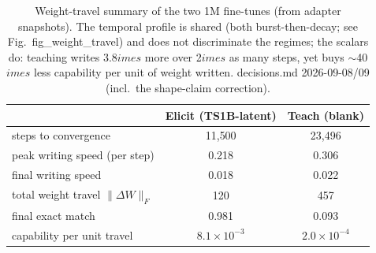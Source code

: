 \begin{table}[t]
\centering
\begin{tabular}{lcc}
\hline
 & Elicit (TS1B-latent) & Teach (blank) \\
\hline
steps to convergence & 11{,}500 & 23{,}496 \\
peak writing speed (per step) & 0.218 & 0.306 \\
final writing speed & 0.018 & 0.022 \\
total weight travel $\|\Delta W\|_F$ & 120 & 457 \\
final exact match & 0.981 & 0.093 \\
capability per unit travel & $8.1\times10^{-3}$ & $2.0\times10^{-4}$ \\
\hline
\end{tabular}
\caption{Weight-travel summary of the two 1M fine-tunes (from adapter snapshots). The temporal profile is shared (both burst-then-decay; see Fig.~fig\_weight\_travel) and does not discriminate the regimes; the scalars do: teaching writes 3.8$	imes$ more over 2$	imes$ as many steps, yet buys $\sim$40$	imes$ less capability per unit of weight written. decisions.md 2026-09-08/09 (incl.\ the shape-claim correction).}
\label{tab:weight_travel}
\end{table}
